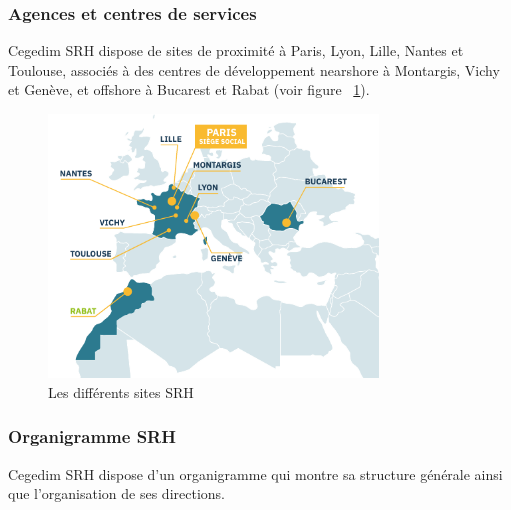 \subsubsection{Agences et centres de services}
Cegedim SRH dispose de sites de proximité à Paris, Lyon, Lille, Nantes et Toulouse, associés à des centres de développement nearshore à Montargis, Vichy et Genève, et offshore à Bucarest et Rabat (voir figure ~\ref{fig:sites_cegedim}).
\begin{figure}[H]
    \centering
    \includegraphics[width=0.78\textwidth]{images/sec1/cegedim-srh-map2.pdf}
    \caption{Les différents sites SRH}
    \label{fig:sites_cegedim}
\end{figure}
\subsubsection{Organigramme SRH}
Cegedim SRH dispose d’un organigramme qui montre sa structure générale ainsi que l’organisation de ses directions.

